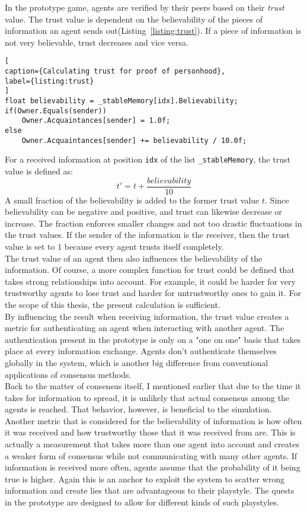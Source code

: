 In the prototype game, agents are verified by their peers based on their \textit{trust} value. The trust value is dependent on the believability of the pieces of information an agent sends out(Listing~\ref{listing:trust}). If a piece of information is not very believable, trust decreases and vice versa.
\begin{lstlisting}[
caption={Calculating trust for proof of personhood},
label={listing:trust}
]
float believability = _stableMemory[idx].Believability;
if(Owner.Equals(sender))
	Owner.Acquaintances[sender] = 1.0f;
else
	Owner.Acquaintances[sender] += believability / 10.0f;
\end{lstlisting}
For a received information at position \verb|idx| of the list \verb|_stableMemory|, the trust value is defined as:
\begin{equation}
t' = t + \frac{believability}{10}
\end{equation}
A small fraction of the believability is added to the former trust value $t$. Since believability can be negative and positive, and trust can likewise decrease or increase. The fraction enforces smaller changes and not too drastic fluctuations in the trust values. If the sender of the information is the receiver, then the trust value is set to $1$ because every agent trusts itself completely.\\
The trust value of an agent then also influences the believability of the information. Of course, a more complex function for trust could be defined that takes strong relationships into account. For example, it could be harder for very trustworthy agents to lose trust and harder for untrustworthy ones to gain it. For the scope of this thesis, the present calculation is sufficient.\\
By influencing the result when receiving information, the trust value creates a metric for authenticating an agent when interacting with another agent. The authentication present in the prototype is only on a "one on one" basis that takes place at every information exchange. Agents don’t authenticate themselves globally in the system, which is another big difference from conventional applications of consensus methods.\\
Back to the matter of consensus itself, I mentioned earlier that due to the time it takes for information to spread, it is unlikely that actual consensus among the agents is reached. That behavior, however, is beneficial to the simulation.\\
Another metric that is considered for the believability of information is how often it was received and how trustworthy those that it was received from are. This is actually a measurement that takes more than one agent into account and creates a weaker form of consensus while not communicating with many other agents. If information is received more often, agents assume that the probability of it being true is higher. Again this is an anchor to exploit the system to scatter wrong information and create lies that are advantageous to their playstyle. The quests in the prototype are designed to allow for different kinds of such playstyles.
